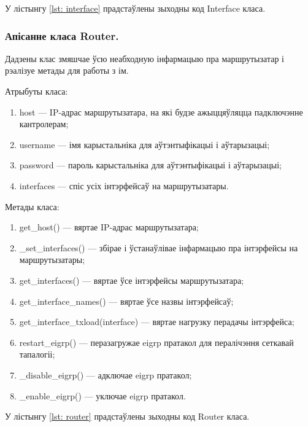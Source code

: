У лістынгу \ref{lst: interface} прадстаўлены зыходны код Interface класа.



\vspace{-\baselineskip}

\subsubsection{Апісанне класа Router.}

Дадзены клас змяшчае ўсю неабходную інфармацыю пра маршрутызатар і рэалізуе
метады для работы з ім.

Атрыбуты класа:
\begin{enumerate}
    \item host --- IP-адрас маршрутызатара, на які будзе ажыццяўляцца падключэнне кантролерам;
    \item username --- імя карыстальніка для аўтэнтыфікацыі і аўтарызацыі;
    \item password --- пароль карыстальніка для аўтэнтыфікацыі і аўтарызацыі;
    \item interfaces --- спіс усіх інтэрфейсаў на маршрутызатары.
\end{enumerate}

Метады класа:
\begin{enumerate}
    \item get\_host() --- вяртае IP-адрас маршрутызатара;
    \item \_set\_interfaces() --- збірае і ўстанаўлівае інфармацыю пра інтэрфейсы на маршрутызатары;
    \item get\_interfaces() --- вяртае ўсе інтэрфейсы маршрутызатара;
    \item get\_interface\_names() --- вяртае ўсе назвы інтэрфейсаў;
    \item get\_interface\_txload(interface) --- вяртае нагрузку перадачы інтэрфейса;
    \item restart\_eigrp() --- перазагружае eigrp пратакол для пералічэння сеткавай тапалогіі;
    \item \_disable\_eigrp() --- адключае eigrp пратакол;
    \item \_enable\_eigrp() --- уключае eigrp пратакол.
\end{enumerate}

У лістынгу \ref{lst: router} прадстаўлены зыходны код Router класа.


